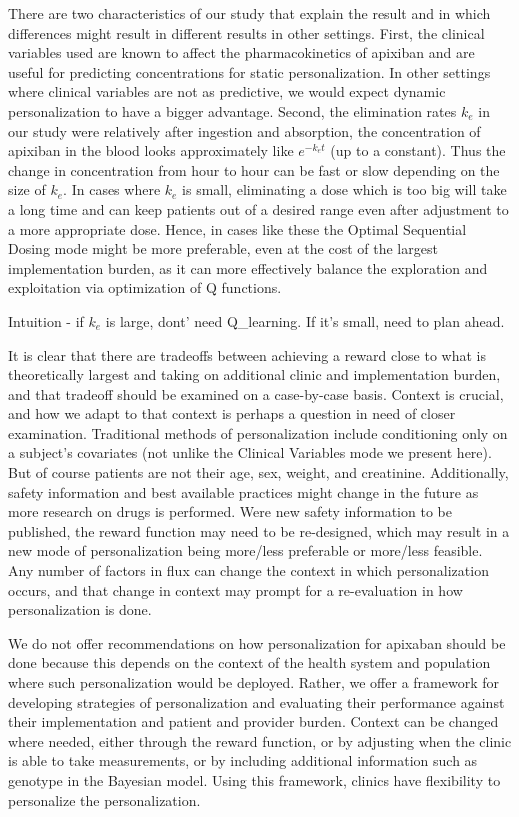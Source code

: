 There are two characteristics of our study that explain the result and in which differences might result in different results in other settings. First, the clinical variables used are known to affect the pharmacokinetics of apixiban and are useful for predicting concentrations for static personalization. In other settings where clinical variables are not as predictive, we would expect dynamic personalization to have a bigger advantage. Second, the elimination rates $k_e$ in our study were relatively after ingestion and absorption, the concentration of apixiban in the blood looks approximately like $e^{-k_e t}$ (up to a constant).  Thus the change in concentration from hour to hour can be fast or slow depending on the size of $k_e$.  In cases where $k_e$ is small, eliminating a dose which is too big will take a long time and can keep patients out of a desired range even after adjustment to a more appropriate dose.  Hence, in cases like these the Optimal Sequential Dosing mode might be more preferable, even at the cost of the largest implementation burden, as it can more effectively balance the exploration and exploitation via optimization of Q functions.


Intuition - if $k_e$ is large, dont' need Q_learning. If it's small, need to plan ahead.

It is clear that there are tradeoffs between achieving a reward close to what is theoretically largest and taking on additional clinic and implementation burden, and that tradeoff should be examined on a case-by-case basis.  Context is crucial, and how we adapt to that context is perhaps a question in need of closer examination.  Traditional methods of personalization include conditioning only on a subject’s covariates (not unlike the Clinical Variables mode we present here).  But of course patients are not their age, sex, weight, and creatinine.  Additionally, safety information and best available practices might change in the future as more research on drugs is performed. Were new safety information to be published, the reward function may need to be re-designed, which may result in a new mode of personalization being more/less preferable or more/less feasible.  Any number of factors in flux can change the context in which personalization occurs, and that change in context may prompt for a re-evaluation in how personalization is done.

We do not offer recommendations on how personalization for apixaban should be done because this depends on the context of the health system and population where such personalization would be deployed. Rather, we offer  a framework for developing strategies of personalization and evaluating their performance against their implementation and patient and provider burden.  Context can be changed where needed, either through the reward function, or by adjusting when the clinic is able to take measurements, or by including additional information such as genotype in the Bayesian model.  Using this framework, clinics have flexibility to personalize the personalization.


